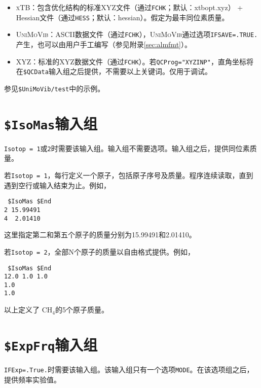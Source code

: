 \documentclass[12pt,a4paper,openany,twoside,cap,UTF8]{ctexbook}
\begin{document}
\begin{itemize}
\item \textsc{xTB}：包含优化结构的标准XYZ文件（通过\verb|FCHK|；默认：xtbopt.xyz） + Hessian文件（通过\verb|HESS|；默认：hessian）。假定为最丰同位素质量。
\item \textsc{UniMoVib}：ASCII数据文件（通过\verb|FCHK|），\textsc{UniMoVib}通过选项\verb|IFSAVE=.TRUE.|产生，也可以由用户手工编写（参见附录\ref{sec:almfmt}）。
\item XYZ：标准的XYZ数据文件（通过\verb|FCHK|）。若\verb|QCProg="XYZINP"|，直角坐标将在\texttt{\$QCData}输入组之后提供，不需要以上关键词。仅用于调试。
\end{itemize}

参见\verb|$UniMoVib/test|中的示例。

\section{\texttt{\$IsoMas}输入组} \label{sec:inp-isomas}

\verb|Isotop = 1|或\verb|2|时需要该输入组。输入组不需要选项。输入组之后，提供同位素质量。

\bigskip{}\noindent
若\verb|Isotop = 1|，每行定义一个原子，包括原子序号及质量。程序连续读取，直到遇到空行或输入结束为止。例如，
\begin{colorboxed}[oval=false,boxcolor=blue!75!black,bgcolor=blue!5!white]
\ttfamily
\begin{lstlisting}
 $IsoMas $End
2 15.99491
4  2.01410
\end{lstlisting}\end{colorboxed}
这里指定第二和第五个原子的质量分别为15.99491和2.01410。

\bigskip{}\noindent
若\verb|Isotop = 2|，全部N个原子的质量以自由格式提供。例如，\\
\begin{colorboxed}[oval=false,boxcolor=blue!75!black,bgcolor=blue!5!white]
\ttfamily
\begin{lstlisting}
 $IsoMas $End
12.0 1.0 1.0
1.0
1.0
\end{lstlisting}\end{colorboxed}
以上定义了 CH$_4$的5个原子质量。

\section{\texttt{\$ExpFrq}输入组} \label{sec:inp-expfrq}

\verb|IFExp=.True.|时需要该输入组。该输入组只有一个选项\verb|MODE|。在该选项组之后，提供频率实验值。
\end{document}
